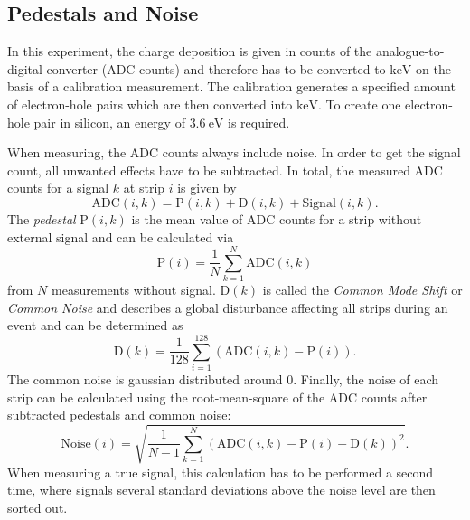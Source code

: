 \subsection{Pedestals and Noise}
\label{ch:ped}
In this experiment, the charge deposition is given in counts of the analogue-to-digital converter (ADC counts) and therefore has to be converted to $\unit{\kilo\eV}$ 
on the basis of a calibration measurement. The calibration generates a specified amount of electron-hole pairs which are then converted into $\unit{\kilo\eV}$.
To create one electron-hole pair in silicon, an energy of $\qty{3.6}{\eV}$ \cite{SiliconStrip} is required.

When measuring, the ADC counts always include noise. In order to get the signal count, all unwanted effects have to be subtracted.
In total, the measured ADC counts for a signal $k$ at strip $i$ is given by 
\begin{equation}
    \text{ADC}(i, k) = \text{P}(i, k) + \text{D}(i,k) + \text{Signal}(i, k).
    \label{eq:ADC}
\end{equation}    
The \textit{pedestal} $\text{P}(i, k)$ is the mean value of ADC counts for a strip without external signal and can be calculated via 
\begin{equation}
    \text{P}(i) = \frac{1}{N} \sum^N_{k = 1} \text{ADC}(i,k)
    \label{eq:pedestals}
\end{equation}
from $N$ measurements without signal. $\text{D}(k)$ is called the \textit{Common Mode Shift} or \textit{Common Noise} and describes a global disturbance affecting all 
strips during an event and can be determined as 
\begin{equation}
    \text{D}(k) = \frac{1}{128} \sum^{128}_{i = 1} (\text{ADC}(i,k) -\text{P}(i)).
    \label{eq:common_noise}
\end{equation}
The common noise is gaussian distributed around 0.
Finally, the noise of each strip can be calculated using the root-mean-square of the ADC counts after subtracted pedestals and common noise:
\begin{equation}
    \text{Noise}(i) = \sqrt{\frac{1}{N-1} \sum^{N}_{k = 1} (\text{ADC}(i,k) -\text{P}(i) - \text{D}(k))^2}.
    \label{eq:noise}
\end{equation}
When measuring a true signal, this calculation has to be performed a second time, where signals several standard deviations above the noise level are then sorted out.

